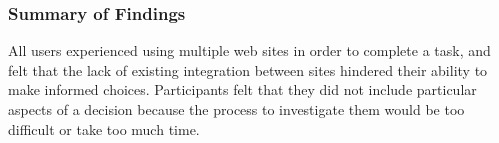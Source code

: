 \documentclass{sigchi}
\begin{document}
\subsubsection{Summary of Findings}

All users experienced using multiple web sites in order to complete a task, and felt that the lack of existing integration between sites hindered their ability to make informed choices. Participants felt that they did not include particular aspects of a decision because the process to investigate them would be too difficult or take too much time. 

\end{document}
